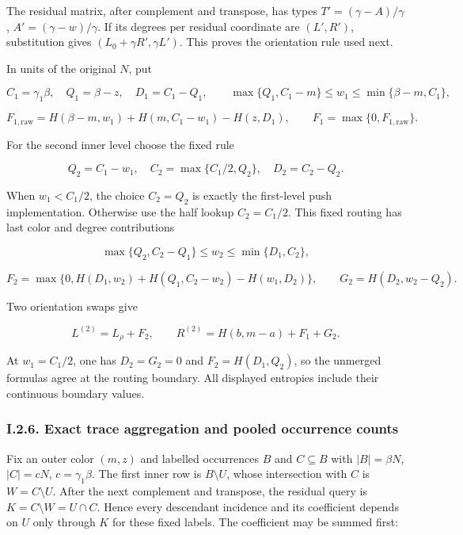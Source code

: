 The residual matrix, after complement and transpose, has types \(T'=(\gamma-A)/\gamma\), \(A'=(\gamma-w)/\gamma\). If its degrees per residual coordinate are \((L',R')\), substitution gives \((L_0+\gamma R',\gamma L')\). This proves the orientation rule used next.

In units of the original \(N\), put

\[
C_1=\gamma_1\beta,\quad Q_1=\beta-z,\quad D_1=C_1-Q_1,
\qquad
\max\{Q_1,C_1-m\}\le w_1\le\min\{\beta-m,C_1\},
\]

\[
F_{1,\mathrm{raw}}=H(\beta-m,w_1)+H(m,C_1-w_1)-H(z,D_1),
\qquad F_1=\max\{0,F_{1,\mathrm{raw}}\}.
\tag{43}
\]

For the second inner level choose the fixed rule

\[
Q_2=C_1-w_1,\quad C_2=\max\{C_1/2,Q_2\},\quad D_2=C_2-Q_2.
\tag{44}
\]

When \(w_1<C_1/2\), the choice \(C_2=Q_2\) is exactly the first-level push implementation. Otherwise use the half lookup \(C_2=C_1/2\). This fixed routing has last color and degree contributions

\[
\max\{Q_2,C_2-Q_1\}\le w_2\le\min\{D_1,C_2\},
\]

\[
F_2=\max\{0,H(D_1,w_2)+H(Q_1,C_2-w_2)-H(w_1,D_2)\},
\qquad G_2=H(D_2,w_2-Q_2).
\tag{45}
\]

Two orientation swaps give

\[
L^{(2)}=L_\rho+F_2,\qquad
R^{(2)}=H(b,m-a)+F_1+G_2.
\tag{46}
\]

At \(w_1=C_1/2\), one has \(D_2=G_2=0\) and \(F_2=H(D_1,Q_2)\), so the unmerged formulas agree at the routing boundary. All displayed entropies include their continuous boundary values.

\hypertarget{af-a9ec399514-i.2.6.-exact-trace-aggregation-and-pooled-occurrence-counts}{%
\subsubsection{I.2.6. Exact trace aggregation and pooled occurrence counts}\label{af-a9ec399514-i.2.6.-exact-trace-aggregation-and-pooled-occurrence-counts}}

Fix an outer color \((m,z)\) and labelled occurrences \(B\) and \(C\subseteq B\) with \(|B|=\beta N\), \(|C|=cN\), \(c=\gamma_1\beta\). The first inner row is \(B\setminus U\), whose intersection with \(C\) is \(W=C\setminus U\). After the next complement and transpose, the residual query is \(K=C\setminus W=U\cap C\). Hence every descendant incidence and its coefficient depends on \(U\) only through \(K\) for these fixed labels. The coefficient may be summed first:

